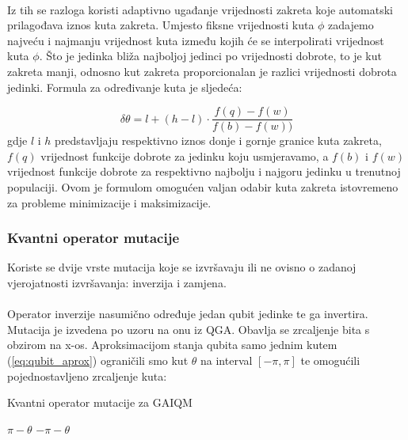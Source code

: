 \documentclass[times, utf8, zavrsni, numeric]{fer}
\begin{document}
\paragraph{}
Iz tih se razloga koristi adaptivno ugađanje vrijednosti zakreta koje automatski prilagođava iznos kuta zakreta.\citep{adaptive_qga} Umjesto fiksne vrijednosti kuta $\phi$ zadajemo najveću i najmanju vrijednost kuta između kojih će se interpolirati vrijednost kuta $\phi$. Što je jedinka bliža najboljoj jedinci po vrijednosti dobrote, to je kut zakreta manji, odnosno kut zakreta proporcionalan je razlici vrijednosti dobrota jedinki. Formula za određivanje kuta je sljedeća:

\begin{equation}
\label{eq:adapt}
\delta\theta = l + (h - l) \cdot \frac{f(q) - f(w)}{f(b) - f(w))}
\end{equation}
gdje $l$ i $h$ predstavljaju respektivno iznos donje i gornje granice kuta zakreta, $f(q)$ vrijednost funkcije dobrote za jedinku koju usmjeravamo, a $f(b)$ i $f(w)$ vrijednost funkcije dobrote za respektivno najbolju i najgoru jedinku u trenutnoj populaciji. Ovom je formulom omogućen valjan odabir kuta zakreta istovremeno za probleme minimizacije i maksimizacije.

\newpage

\subsubsection{Kvantni operator mutacije}
Koriste se dvije vrste mutacija koje se izvršavaju ili ne ovisno o zadanoj vjerojatnosti izvršavanja: inverzija i zamjena.

\paragraph{}
Operator inverzije nasumično određuje jedan qubit jedinke te ga invertira. Mutacija je izvedena po uzoru na onu iz QGA. Obavlja se zrcaljenje bita s obzirom na x-os. Aproksimacijom stanja qubita samo jednim kutem (\ref{eq:qubit_aprox}) ograničili smo kut $\theta$ na interval $[-\pi, \pi]$ te omogućili pojednostavljeno zrcaljenje kuta:
\begin{algorithm}
\caption{Kvantni operator mutacije za GAIQM}
\label{algo:gaiqm_mut}
\begin{algorithmic}
\RETURN $\pi - \theta$
\ELSE
\RETURN $-\pi - \theta$
\ENDIF
\end{algorithmic}
\end{algorithm}
\end{document}
